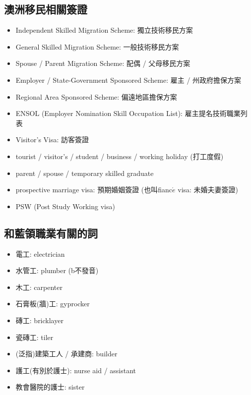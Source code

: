 \subsection{澳洲移民相關簽證}
\begin{itemize}
  \itemsep0em
  \item Independent Skilled Migration Scheme: 獨立技術移民方案
  \item General Skilled Migration Scheme: 一般技術移民方案
  \item Spouse / Parent Migration Scheme: 配偶 / 父母移民方案
  \item Employer / State-Government Sponsored Scheme: 雇主 / 州政府擔保方案
  \item Regional Area Sponsored Scheme: 偏遠地區擔保方案
  \item ENSOL (Employer Nomination Skill Occupation List): 雇主提名技術職業列表
  \item Visitor's Visa: 訪客簽證
  \item tourist / visitor's / student / business / working holiday (打工度假)
  \item parent / spouse / temporary skilled graduate
  \item prospective marriage visa: 預期婚姻簽證 (也叫fianc$\acute{e}$ visa: 未婚夫妻簽證)
  \item PSW (Post Study Working visa)
\end{itemize}

\subsection{和藍領職業有關的詞}
\begin{multicols}{2}
\begin{itemize}
  \itemsep0em
  \item 電工: electrician
  \item 水管工: plumber (b不發音)
  \item 木工: carpenter
  \item 石膏板(牆)工: gyprocker
  \item 磚工: bricklayer
  \item 瓷磚工: tiler
  \item (泛指)建築工人 / 承建商: builder
  \item 護工(有別於護士): nurse aid / assistant
  \item 教會醫院的護士: sister
\end{itemize}
\end{multicols}

